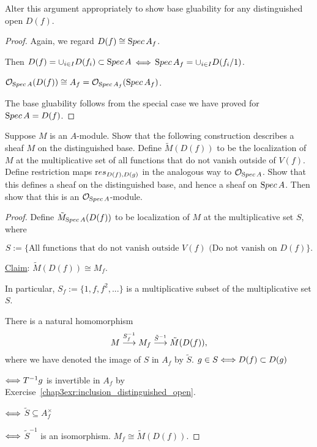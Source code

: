 \documentclass[11pt,fleqn]{book}
\begin{document}
\begin{exr}
Alter this argument appropriately to show base gluability for any distinguished open $D(f)$.
\end{exr}
\begin{proof}
Again, we regard $D(f)\cong {\text Spec\,} A_f$. 

Then $D(f)=\cup_{i\in I}D(f_i)\subset {\text Spec\,} A$ $\Longleftrightarrow$ ${\text Spec\,} A_f=\cup_{i\in I} D(f_i/1)$.

${\cal O}_{{\text Spec\,} A}(D(f))\cong A_f={\cal O}_{{\text Spec\,} A_f}({\text Spec\,} A_f)$.

The base gluability follows from the special case we have proved for ${\text Spec\,} A=D(f)$.
\end{proof}
\begin{exr}
Suppose $M$ is an $A$-module. Show that the following construction describes a sheaf $M$  on the distinguished base. Define $ \tilde{M}(D(f))$ to be the localization of $M$ at the multiplicative set of all functions that do not vanish outside of $ V(f)$. Define restriction maps ${\text res}_{D(f),D(g)}$ in the analogous way to ${\cal O}_{{\text Spec\,} A}$. Show that this defines a sheaf on the distinguished base, and hence a sheaf on ${\text Spec\,} A$. Then show that this is an ${\cal O}_{{\text Spec\,} A}$-module.
\end{exr}
\begin{proof}
Define $\tilde{M}_{{\text Spec\,} A}(D(f))$ to be localization of $M$ at the multiplicative set $S$, where

$$
S:=\{\text{All functions that do not vanish outside $V(f)$ (Do not vanish on $D(f)$}\}.
$$

\underline{Claim}: $\tilde{M}(D(f))\cong M_f$.

 In particular, $S_f:=\{1,f,f^2,...\}$ is a multiplicative subset of the multiplicative set $S$.

 There is a natural homomorphism 
$$
M\overset{S_f^{-1}}{\longrightarrow}M_f\overset{\tilde{S}^{-1}}{\longrightarrow}\tilde{M}(D(f)), 
$$
where we have denoted the image of $S$ in $A_f$ by $\tilde{S}$. $g\in S\Longleftrightarrow D(f)\subset D(g)$

$\Longleftrightarrow T^{-1}g$ is invertible in $A_f$ by Exercise~\ref{chap3exr:inclusion_distinguished_open}.

$\Longleftrightarrow$ $\tilde{S}\subseteq A_f^\times$

$\Longleftrightarrow$ $\tilde{S}^{-1}$ is an isomorphism. $M_f\cong \tilde{M}(D(f))$.
\end{proof}
\end{document}
